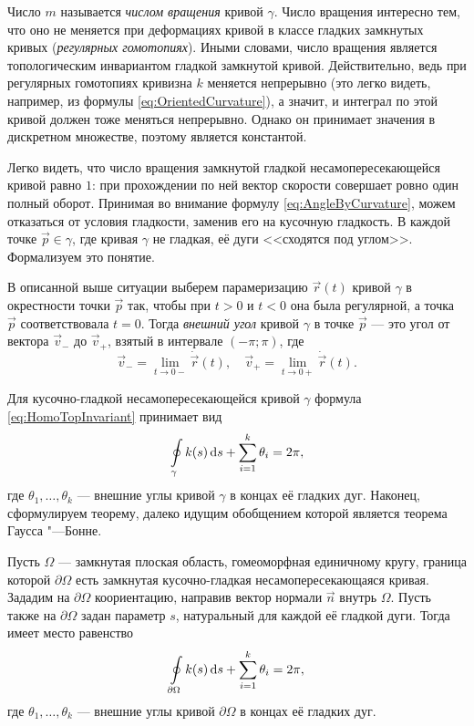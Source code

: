 Число $m$ называется \textit{числом вращения} кривой $\gamma$. Число вращения интересно тем, что оно не меняется при деформациях кривой в классе гладких замкнутых кривых (\textit{регулярных гомотопиях}). Иными словами, число вращения является топологическим инвариантом гладкой замкнутой кривой. Действительно, ведь при регулярных гомотопиях кривизна $k$ меняется непрерывно (это легко видеть, например, из формулы \eqref{eq:OrientedCurvature}), а значит, и интеграл по этой кривой должен тоже меняться непрерывно. Однако он принимает значения в дискретном множестве, поэтому является константой.

Легко видеть, что число вращения замкнутой гладкой несамопересекающейся кривой равно $1$: при прохождении по ней вектор скорости совершает ровно один полный оборот. Принимая во внимание формулу \eqref{eq:AngleByCurvature}, можем отказаться от условия гладкости, заменив его на кусочную гладкость. В каждой точке $\vec{p} \in \gamma$, где кривая $\gamma$ не гладкая, её дуги <<сходятся под углом>>. Формализуем это понятие.

\begin{definition}
	В описанной выше ситуации выберем парамеризацию $\vec{r}(t)$ кривой $\gamma$ в окрестности точки $\vec{p}$ так, чтобы при $t > 0$ и $t < 0$ она была регулярной, а точка $\vec{p}$ соответствовала $t = 0$. Тогда \textit{внешний угол} кривой $\gamma$ в точке $\vec{p}$ --- это угол от вектора $\vec{v}_{-}$ до $\vec{v}_{+}$, взятый в интервале $(-\pi; \pi)$, где
	\[
		\vec{v}_{-} = \lim_{t \to 0-}\dot{\vec{r}}(t),\quad
		\vec{v}_{+} = \lim_{t \to 0+}\dot{\vec{r}}(t).
	\]
\end{definition} %

Для кусочно-гладкой несамопересекающейся кривой $\gamma$ формула \eqref{eq:HomoTopInvariant} принимает вид
\[
	\oint\limits_{\gamma}k(s)\mathop{}\!\mathrm{d} s + \sum_{i = 1}^k\theta_i = 2\pi,
\]
где $\theta_1, \ldots, \theta_k$ --- внешние углы кривой $\gamma$ в концах её гладких дуг. Наконец, сформулируем теорему, далеко идущим обобщением которой является теорема Гаусса "---Бонне.

\begin{theorem} \label{theorem:PlaneGB}
	Пусть $\Omega$ --- замкнутая плоская область, гомеоморфная единичному кругу, граница которой $\partial\Omega$ есть замкнутая кусочно-гладкая несамопересекающаяся кривая. Зададим на $\partial\Omega$ коориентацию, направив вектор нормали $\vec{n}$ внутрь $\Omega$. Пусть также на $\partial\Omega$ задан параметр $s$, натуральный для каждой её гладкой дуги. Тогда имеет место равенство
	\[
		\oint\limits_{\partial\Omega}k(s)\mathop{}\!\mathrm{d} s + \sum_{i = 1}^k\theta_i = 2\pi,
	\]
	где $\theta_1, \ldots, \theta_k$ --- внешние углы кривой $\partial\Omega$ в концах её гладких дуг.
\end{theorem}

